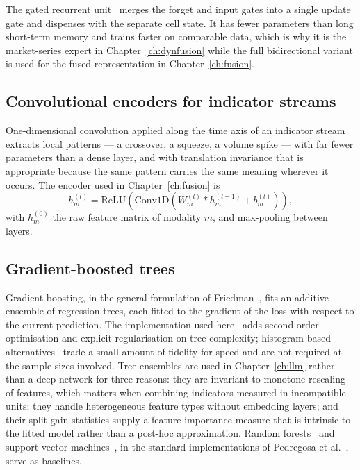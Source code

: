 The gated recurrent unit~\cite{cho2014gru} merges the forget and input gates into a single
update gate and dispenses with the separate cell state. It has fewer parameters than long
short-term memory and trains faster on comparable data, which is why it is the market-series
expert in Chapter~\ref{ch:dynfusion} while the full bidirectional variant is used for the fused
representation in Chapter~\ref{ch:fusion}.

\subsection{Convolutional encoders for indicator streams}

One-dimensional convolution applied along the time axis of an indicator stream extracts local
patterns --- a crossover, a squeeze, a volume spike --- with far fewer parameters than a dense
layer, and with translation invariance that is appropriate because the same pattern carries the
same meaning wherever it occurs. The encoder used in Chapter~\ref{ch:fusion} is
\begin{equation}
h_m^{(l)} = \mathrm{ReLU}\!\left(\mathrm{Conv1D}\!\left(W_m^{(l)} * h_m^{(l-1)} +
b_m^{(l)}\right)\right),
\label{eq:conv}
\end{equation}
with $h_m^{(0)}$ the raw feature matrix of modality $m$, and max-pooling between layers.

\subsection{Gradient-boosted trees}

Gradient boosting, in the general formulation of Friedman~\cite{friedman2001}, fits an additive
ensemble of regression trees, each fitted to the gradient of the loss with respect to the current
prediction. The implementation used here~\cite{chen2016xgboost} adds second-order optimisation and
explicit regularisation on tree complexity; histogram-based alternatives~\cite{ke2017lightgbm}
trade a small amount of fidelity for speed and are not required at the sample sizes involved.
Tree ensembles are used in Chapter~\ref{ch:llm} rather than a deep network for three reasons:
they are invariant to monotone rescaling of features, which matters when combining indicators
measured in incompatible units; they handle heterogeneous feature types without embedding layers;
and their split-gain statistics supply a feature-importance measure that is intrinsic to the
fitted model rather than a post-hoc approximation. Random forests~\cite{breiman2001} and support
vector machines~\cite{cortes1995svm}, in the standard implementations of
Pedregosa et al.~\cite{pedregosa2011}, serve as baselines.

